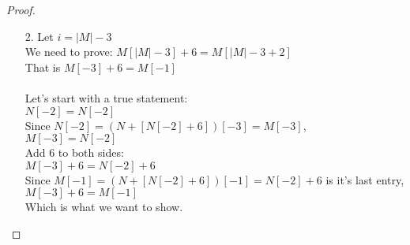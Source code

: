 \documentclass[fontsize=11pt]{article}
\begin{document}
\begin{enumerate}
\begin{enumerate}
\begin{proof}
\begin{enumerate}
    \item[2.] Let $i = |M| - 3$ \\
        We need to prove: $M[|M| - 3] + 6 = M[|M| - 3 + 2]$ \\
        That is $M[-3] + 6 = M[-1]$ \\
        \\
        Let's start with a true statement: \\
        $N[-2] = N[-2]$ \\
        Since $N[-2] = (N + [N[-2] + 6])[-3] = M[-3]$, \\
        $M[-3] = N[-2]$ \\
        Add 6 to both sides: \\ 
        $M[-3] + 6 = N[-2] + 6$ \\
        Since $M[-1] = (N + [N[-2] + 6])[-1] = N[-2] + 6$ is it's last entry, \\
        $M[-3] + 6 = M[-1]$ \\
        Which is what we want to show.
        
\end{enumerate}
\end{proof}


\end{enumerate}
\end{enumerate}
\end{document}
